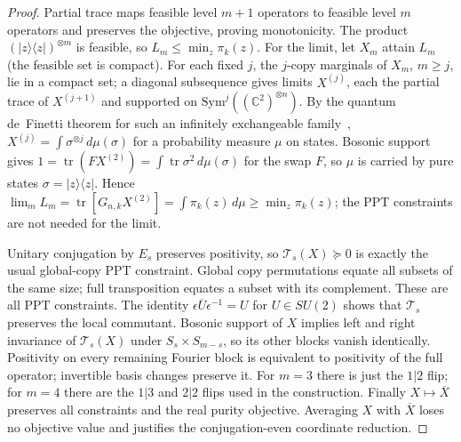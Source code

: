 \begin{proof}
Partial trace maps feasible level $m+1$ operators to feasible level
$m$ operators and preserves the objective, proving monotonicity.
The product $(|z\rangle\langle z|)^{\otimes m}$ is feasible, so $L_m\le\min_z\pi_k(z)$.
For the limit, let $X_m$ attain $L_m$ (the feasible set is compact). For each fixed $j$, the $j$-copy
marginals of $X_m$, $m\ge j$, lie in a compact set; a diagonal subsequence gives limits $X^{(j)}$, each the
partial trace of $X^{(j+1)}$ and supported on $\mathrm{Sym}^j((\mathbb C^2)^{\otimes n})$. By the quantum
de~Finetti theorem for such an infinitely exchangeable family~\cite{HudsonMoody}, $X^{(j)}=\int\sigma^{\otimes j}\,d\mu(\sigma)$ for a
probability measure $\mu$ on states. Bosonic support gives
$1=\operatorname{tr}(FX^{(2)})=\int\operatorname{tr}\sigma^2\,d\mu(\sigma)$ for the swap $F$, so $\mu$ is carried by
pure states $\sigma=|z\rangle\langle z|$. Hence
$\lim_mL_m=\operatorname{tr}[G_{n,k}X^{(2)}]=\int\pi_k(z)\,d\mu\ge\min_z\pi_k(z)$; the PPT constraints are not
needed for the limit.

Unitary conjugation by $E_s$ preserves positivity, so
$\mathcal T_s(X)\succeq0$ is exactly the usual global-copy PPT
constraint. Global copy permutations equate all subsets of the same
size; full transposition equates a subset with its complement. These
are all PPT constraints. The identity
$\epsilon\overline U\epsilon^{-1}=U$ for $U\in SU(2)$ shows that
$\mathcal T_s$ preserves the local commutant. Bosonic support of $X$
implies left and right invariance of $\mathcal T_s(X)$ under
$S_s\times S_{m-s}$, so its other blocks vanish identically.
Positivity on every remaining Fourier block is equivalent to
positivity of the full operator; invertible basis changes preserve it.
For $m=3$ there is just the $1|2$ flip; for $m=4$ there are the
$1|3$ and $2|2$ flips used in the construction.
Finally $X\mapsto\overline X$ preserves all constraints and the real
purity objective. Averaging $X$ with $\overline X$ loses no objective
value and justifies the conjugation-even coordinate reduction.
\end{proof}


